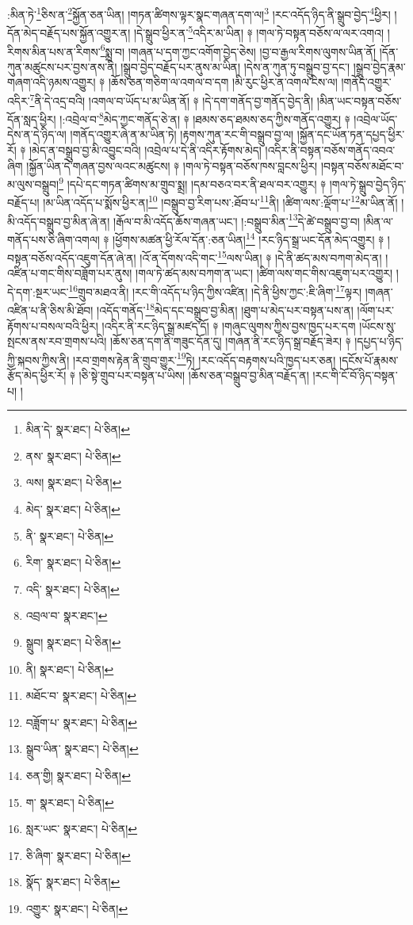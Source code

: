:མིན་ཏེ་\footnote{མིན་དེ་  སྣར་ཐང་།  པེ་ཅིན། }ཅིས་ན་\footnote{ནས་  སྣར་ཐང་།  པེ་ཅིན། }སྐྱོན་ཅན་ཡིན། །གཏན་ཚིགས་ལྟར་སྣང་གཞན་དག་ལ།\footnote{ལས།  སྣར་ཐང་།  པེ་ཅིན། } །རང་འདོད་ཉིད་ནི་སྒྲུབ་བྱེད་\footnote{མེད་  སྣར་ཐང་།  པེ་ཅིན། }ཕྱིར། །དོན་མེད་བརྗོད་པས་སྐྱོན་འགྱུར་ན། །དེ་སྒྲུབ་ཕྱིར་ན་\footnote{ནི་  སྣར་ཐང་།  པེ་ཅིན། }འདིར་མ་ཡིན། ༈ །གལ་ཏེ་བསྟན་བཅོས་ལ་ལར་འགའ། །རིགས་མིན་པས་ན་རིགས་\footnote{རིག་  སྣར་ཐང་།  པེ་ཅིན། }སྨྲ་བ། །གཞན་པ་དག་ཀྱང་འགོག་བྱེད་ཅེས། །བྱ་བ་རྒྱལ་རིགས་ལུགས་ཡིན་ནོ། །དོན་ཀུན་མཚུངས་པར་བྱས་ནས་ནི། །སྒྲུབ་བྱེད་བརྗོད་པར་ནུས་མ་ཡིན། །དེས་ན་ཀུན་ཏུ་བསྒྲུབ་བྱ་དང་། །སྒྲུབ་བྱེད་རྣམ་གཞག་འདི་ཉམས་འགྱུར། ༈ །ཆོས་ཅན་གཅིག་ལ་འགལ་བ་དག །མི་རུང་ཕྱིར་ན་འགལ་ངེས་ལ། །གནོད་འགྱུར་འདིར་\footnote{འདི་  སྣར་ཐང་།  པེ་ཅིན། }ནི་དེ་འདྲ་བའི། །འགལ་བ་ཡོད་པ་མ་ཡིན་ནོ། ༈ །དེ་དག་གནོད་བྱ་གནོད་བྱེད་ནི། །མིན་ཡང་བསྟན་བཅོས་དོན་སླད་ཕྱིར། །:འབྲེལ་བ་\footnote{འབྲལ་བ་  སྣར་ཐང་། }མེད་ཀྱང་གནོད་ཅེ་ན། ༈ །ཐམས་ཅད་ཐམས་ཅད་ཀྱིས་གནོད་འགྱུར། ༈ །འབྲེལ་ཡོད་དེས་ན་དེ་ཉིད་ལ། །གནོད་འགྱུར་ཞེ་ན་མ་ཡིན་ཏེ། །རྟགས་ཀུན་རང་གི་བསྒྲུབ་བྱ་ལ། །སྐྱོན་དང་ཡོན་ཏན་དཔྱད་ཕྱིར་རོ། ༈ །མེད་ན་བསྒྲུབ་བྱ་མི་འབྱུང་བའི། །འབྲེལ་པ་དེ་ནི་འདིར་རྟོགས་མེད། །འདིར་ནི་བསྟན་བཅོས་གནོད་འབའ་ཞིག །སྐྱོན་ཡིན་དེ་གཞན་བྱས་ལའང་མཚུངས། ༈ །གལ་ཏེ་བསྟན་བཅོས་ཁས་བླངས་ཕྱིར། །བསྟན་བཅོས་མཐོང་བ་མ་ལུས་བསྒྲུབ།\footnote{སྒྲུབ།  སྣར་ཐང་།  པེ་ཅིན། } །དཔེ་དང་གཏན་ཚིགས་མ་གྲུབ་སྨྲ། །དམ་བཅའ་བར་ནི་ཐལ་བར་འགྱུར། ༈ །གལ་ཏེ་སྒྲུབ་བྱེད་ཉིད་བརྗོད་པ། །མ་ཡིན་འདོད་པ་སྨོས་ཕྱིར་ན།\footnote{ནི།  སྣར་ཐང་།  པེ་ཅིན། } །བསྒྲུབ་བྱ་རིག་པས་:ཐོབ་པ་\footnote{མཐོང་བ་  སྣར་ཐང་།  པེ་ཅིན། }ནི། །ཚིག་ལས་:ལྡོག་པ་\footnote{བཟློག་པ་  སྣར་ཐང་།  པེ་ཅིན། }མ་ཡིན་ནོ། །མི་འདོད་བསྒྲུབ་བྱ་མིན་ཞེ་ན། །རྒོལ་བ་མི་འདོད་ཆོས་གཞན་ཡང་། །:བསྒྲུབ་མིན་\footnote{སྒྲུབ་ཡིན་  སྣར་ཐང་།  པེ་ཅིན། }དེ་ཚེ་བསྒྲུབ་བྱ་བ། །མིན་ལ་གནོད་པས་ཅི་ཞིག་འགལ། ༈ །ཕྱོགས་མཚན་ཕྱི་རོལ་དོན་:ཅན་ཡིན།\footnote{ཅན་གྱི།  སྣར་ཐང་།  པེ་ཅིན། } །རང་ཉིད་སྒྲ་ཡང་དོན་མེད་འགྱུར། ༈ །བསྟན་བཅོས་འདོད་འཇུག་དོན་ཞེ་ན། །འོ་ན་དོགས་འདི་གང་\footnote{ག་  སྣར་ཐང་།  པེ་ཅིན། }ལས་ཡིན། ༈ །དེ་ནི་ཚད་མས་བཀག་མེད་ན། །འཛིན་པ་གང་གིས་བཟློག་པར་ནུས། །གལ་ཏེ་ཚད་མས་བཀག་ན་ཡང་། །ཚིག་ལས་གང་གིས་འཇུག་པར་འགྱུར། །དེ་དག་:སྔར་ཡང་\footnote{སླར་ཡང་  སྣར་ཐང་།  པེ་ཅིན། }གྲུབ་མཐའ་ནི། །རང་གི་འདོད་པ་ཉིད་ཀྱིས་འཛིན། །དེ་ནི་ཕྱིས་ཀྱང་:ཇི་ཞིག་\footnote{ཅི་ཞིག་  སྣར་ཐང་།  པེ་ཅིན། }ལྟར། །གཞན་འཛིན་པ་ནི་ཅིས་མི་ཐོབ། །འདོད་གནོད་\footnote{སྣོད་  སྣར་ཐང་།  པེ་ཅིན། }མེད་དང་བསྒྲུབ་བྱ་མིན། །ཐུག་པ་མེད་པར་བསྟན་པས་ན། །ལོག་པར་རྟོགས་པ་བསལ་བའི་ཕྱིར། །འདིར་ནི་རང་ཉིད་སྒྲ་མཛད་དོ། ༈ །གཞུང་ལུགས་ཀྱིས་བྱས་ཁྱད་པར་དག །ཡོངས་སུ་སྤངས་ནས་རབ་གྲགས་པའི། །ཆོས་ཅན་དག་ནི་གཟུང་དོན་དུ། །གཞན་ནི་རང་ཉིད་སྒྲ་བརྗོད་ཟེར། ༈ །དཔྱད་པ་ཉིད་ཀྱི་སྐབས་ཀྱིས་ནི། །རབ་གྲགས་རྟེན་ནི་གྲུབ་གྱུར་\footnote{འགྱུར་  སྣར་ཐང་།  པེ་ཅིན། }ཏེ། །རང་འདོད་བརྟགས་པའི་ཁྱད་པར་ཅན། །དངོས་པོ་རྣམས་རྩོད་མེད་ཕྱིར་རོ། ༈ །ཅི་སྟེ་གྲུབ་པར་བསྟན་པ་ཡིས། །ཆོས་ཅན་བསྒྲུབ་བྱ་མིན་བརྗོད་ན། །རང་གི་ངོ་བོ་ཉིད་བསྟན་པ། །
